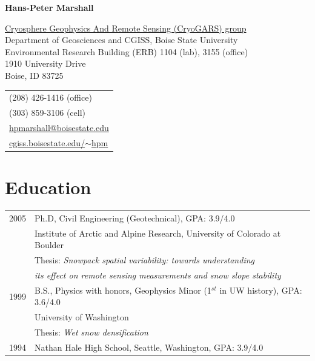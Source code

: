 \documentclass[11pt]{article}
\def\name{Hans-Peter Marshall}
\begin{document}


\centerline{\Large \bf \name}

\vspace{0.25in}

\begin{minipage}{0.70\linewidth}
  \href{http://earth.boisestate.edu/cryogars/}{Cryosphere Geophysics And Remote Sensing (CryoGARS) group} \\
  Department of Geosciences and CGISS, Boise State University \\
  Environmental Research Building (ERB) 1104 (lab), 3155 (office) \\
  1910 University Drive \\
  Boise, ID  83725
\end{minipage}
\begin{minipage}{0.30\linewidth}
  \begin{tabular}{l}
     (208) 426-1416 (office) \\
     (303) 859-3106 (cell) \\
    \href{mailto:hpmarshall@boisestate.edu}{hpmarshall@boisestate.edu} \\
    \href{http://cgiss.boisestate.edu/~hpm}{cgiss.boisestate.edu/$\sim$hpm} \\
  \end{tabular}
\end{minipage}

\section*{Education}

\begin{tabular}{ll}
	2005 & Ph.D, Civil Engineering (Geotechnical), GPA: 3.9/4.0 \\
	          & Institute of Arctic and Alpine Research, University of Colorado at Boulder \\
		 & Thesis: \textit{Snowpack spatial variability: towards understanding} \\
                  &   \textit{its effect on remote sensing measurements and snow slope stability} \\
	1999 &  B.S., Physics with honors, Geophysics Minor (1$^{st}$ in UW history), GPA: 3.6/4.0 \\
	         &   University of Washington \\
	         &  Thesis: \textit{Wet snow densification} \\
       1994  &  Nathan Hale High School, Seattle, Washington, GPA: 3.9/4.0 \\
\end{tabular}
\end{document}
